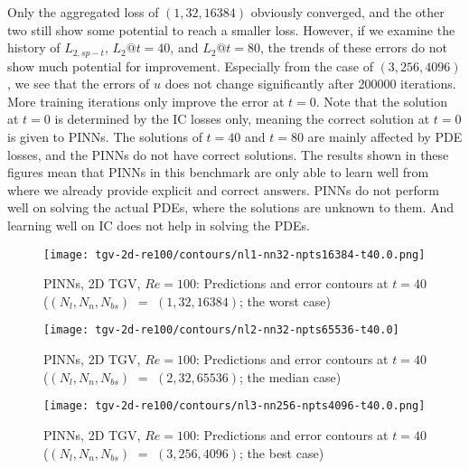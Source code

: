 Only the aggregated loss of $(1, 32, 16384)$ obviously converged, and the other two still show some potential to reach a smaller loss.
However, if we examine the history of $L_{2,sp-t}$, $L_2@t=40$, and $L_2@t=80$, the trends of these errors do not show much potential for improvement.
Especially from the case of $(3, 256, 4096)$, we see that the errors of $u$ does not change significantly after \num{200000} iterations.
More training iterations only improve the error at $t=0$.
Note that the solution at $t=0$ is determined by the IC losses only, meaning the correct solution at $t=0$ is given to PINNs.
The solutions of $t=40$ and $t=80$ are mainly affected by PDE losses, and the PINNs do not have correct solutions.
The results shown in these figures mean that PINNs in this benchmark are only able to learn well from where we already provide explicit and correct answers.
PINNs do not perform well on solving the actual PDEs, where the solutions are unknown to them.
And learning well on IC does not help in solving the PDEs.

\begin{figure}[hbt!]
    \centering%
    \texttt{[image: tgv-2d-re100/contours/nl1-nn32-npts16384-t40.0.png]}
    \caption[%
        PINNs, 2D TGV, $Re=100$: Predictions and error contours at $t=40$ ($(N_l, N_n, N_{bs})=(1, 32, 16384)$; the worst case)%
    ]{%
        PINNs, 2D TGV, $Re=100$: Predictions and error contours at $t=40$ ($(N_l, N_n, N_{bs})$ $=$ $(1, 32, 16384)$; the worst case)%
    }
    \label{fig:nl1-nn32-npts16384-t40-contours}
\end{figure}

\begin{figure}[hbt!]
    \centering%
    \texttt{[image: tgv-2d-re100/contours/nl2-nn32-npts65536-t40.0]}
    \caption[%
        PINNs, 2D TGV, $Re=100$: Predictions and error contours at $t=40$ ($(N_l, N_n, N_{bs})=(2, 32, 65536)$; the median case)%
    ]{%
        PINNs, 2D TGV, $Re=100$: Predictions and error contours at $t=40$ ($(N_l, N_n, N_{bs})$ $=$ $(2, 32, 65536)$; the median case)%
    }
    \label{fig:nl2-nn32-npts65536-t40-contours}
\end{figure}

\begin{figure}[hbt!]
    \centering%
    \texttt{[image: tgv-2d-re100/contours/nl3-nn256-npts4096-t40.0.png]}
    \caption[%
        PINNs, 2D TGV, $Re=100$: Predictions and error contours at $t=40$ ($(N_l, N_n, N_{bs})=(3, 256, 4096)$; the best case)%
    ]{%
        PINNs, 2D TGV, $Re=100$: Predictions and error contours at $t=40$ ($(N_l, N_n, N_{bs})$ $=$ $(3, 256, 4096)$; the best case)%
    }
    \label{fig:nl3-nn256-npts4096-t40-contours}
\end{figure}

